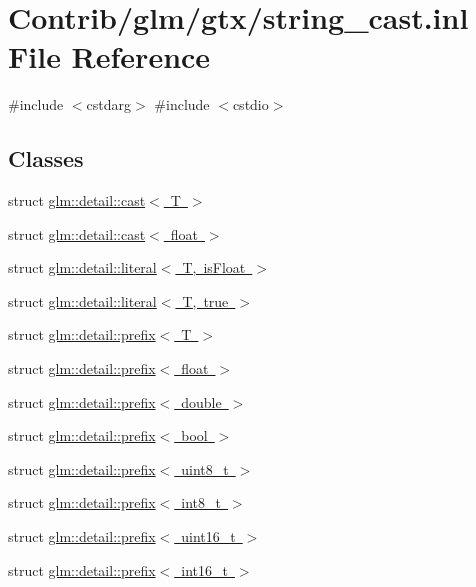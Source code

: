 \hypertarget{string__cast_8inl}{}\section{Contrib/glm/gtx/string\+\_\+cast.inl File Reference}
\label{string__cast_8inl}
{\ttfamily \#include $<$cstdarg$>$}\newline
{\ttfamily \#include $<$cstdio$>$}\newline
\subsection*{Classes}
\begin{DoxyCompactItemize}
\item 
struct \mbox{\hyperlink{structglm_1_1detail_1_1cast}{glm\+::detail\+::cast$<$ T $>$}}
\item 
struct \mbox{\hyperlink{structglm_1_1detail_1_1cast_3_01float_01_4}{glm\+::detail\+::cast$<$ float $>$}}
\item 
struct \mbox{\hyperlink{structglm_1_1detail_1_1literal}{glm\+::detail\+::literal$<$ T, is\+Float $>$}}
\item 
struct \mbox{\hyperlink{structglm_1_1detail_1_1literal_3_01_t_00_01true_01_4}{glm\+::detail\+::literal$<$ T, true $>$}}
\item 
struct \mbox{\hyperlink{structglm_1_1detail_1_1prefix}{glm\+::detail\+::prefix$<$ T $>$}}
\item 
struct \mbox{\hyperlink{structglm_1_1detail_1_1prefix_3_01float_01_4}{glm\+::detail\+::prefix$<$ float $>$}}
\item 
struct \mbox{\hyperlink{structglm_1_1detail_1_1prefix_3_01double_01_4}{glm\+::detail\+::prefix$<$ double $>$}}
\item 
struct \mbox{\hyperlink{structglm_1_1detail_1_1prefix_3_01bool_01_4}{glm\+::detail\+::prefix$<$ bool $>$}}
\item 
struct \mbox{\hyperlink{structglm_1_1detail_1_1prefix_3_01uint8__t_01_4}{glm\+::detail\+::prefix$<$ uint8\+\_\+t $>$}}
\item 
struct \mbox{\hyperlink{structglm_1_1detail_1_1prefix_3_01int8__t_01_4}{glm\+::detail\+::prefix$<$ int8\+\_\+t $>$}}
\item 
struct \mbox{\hyperlink{structglm_1_1detail_1_1prefix_3_01uint16__t_01_4}{glm\+::detail\+::prefix$<$ uint16\+\_\+t $>$}}
\item 
struct \mbox{\hyperlink{structglm_1_1detail_1_1prefix_3_01int16__t_01_4}{glm\+::detail\+::prefix$<$ int16\+\_\+t $>$}}

\end{DoxyCompactItemize}
